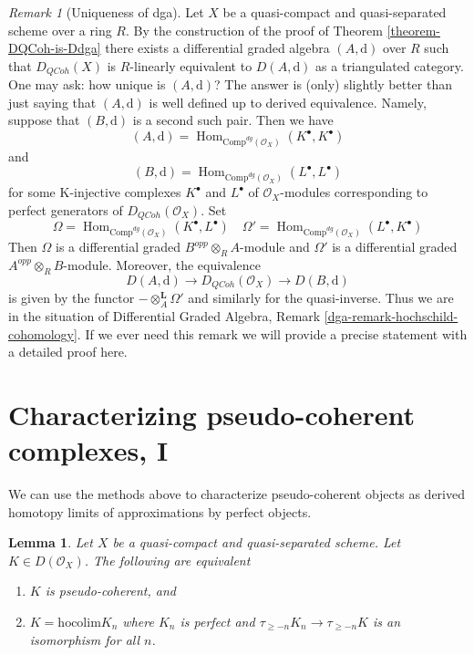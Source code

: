 \documentclass{stacks-project}
\theoremstyle{plain}
\newtheorem{lemma}[subsection]{Lemma}
\theoremstyle{definition}
\theoremstyle{remark}
\newtheorem{remark}[subsection]{Remark}
\numberwithin{equation}{subsection}
\def\Hom{\mathop{\mathrm{Hom}}\nolimits}
\def\QCoh{\mathit{QCoh}}
\begin{document}
\begin{remark}[Uniqueness of dga]
\label{remark-independence-choice}
Let $X$ be a quasi-compact and quasi-separated scheme over a ring $R$.
By the construction of the proof of
Theorem \ref{theorem-DQCoh-is-Ddga}
there exists a differential graded algebra $(A, \text{d})$ over $R$
such that $D_\QCoh(X)$ is $R$-linearly equivalent to
$D(A, \text{d})$ as a triangulated category.
One may ask: how unique is $(A, \text{d})$?
The answer is (only) slightly better than just saying that
$(A, \text{d})$ is well defined up to derived equivalence.
Namely, suppose that $(B, \text{d})$ is a second such pair.
Then we have
$$
(A, \text{d}) = \Hom_{\text{Comp}^{dg}(\mathcal{O}_X)}(K^\bullet, K^\bullet)
$$
and
$$
(B, \text{d}) = \Hom_{\text{Comp}^{dg}(\mathcal{O}_X)}(L^\bullet, L^\bullet)
$$
for some K-injective complexes $K^\bullet$ and $L^\bullet$
of $\mathcal{O}_X$-modules corresponding to perfect generators
of $D_\QCoh(\mathcal{O}_X)$. Set
$$
\Omega = \Hom_{\text{Comp}^{dg}(\mathcal{O}_X)}(K^\bullet, L^\bullet)
\quad
\Omega' = \Hom_{\text{Comp}^{dg}(\mathcal{O}_X)}(L^\bullet, K^\bullet)
$$
Then $\Omega$ is a differential graded $B^{opp} \otimes_R A$-module
and $\Omega'$ is a differential graded $A^{opp} \otimes_R B$-module.
Moreover, the equivalence
$$
D(A, \text{d}) \to D_\QCoh(\mathcal{O}_X) \to
D(B, \text{d})
$$
is given by the functor $- \otimes_A^\mathbf{L} \Omega'$ and
similarly for the quasi-inverse. Thus we are in the situation
of Differential Graded Algebra, Remark \ref{dga-remark-hochschild-cohomology}.
If we ever need this remark we will provide a precise statement
with a detailed proof here.
\end{remark}






\section{Characterizing pseudo-coherent complexes, I}
\label{section-pseudo-coherent-hocolim}

\noindent
We can use the methods above to characterize pseudo-coherent
objects as derived homotopy limits of approximations by perfect objects.

\begin{lemma}
\label{lemma-pseudo-coherent-hocolim}
Let $X$ be a quasi-compact and quasi-separated scheme.
Let $K \in D(\mathcal{O}_X)$. The following are equivalent
\begin{enumerate}
\item $K$ is pseudo-coherent, and
\item $K = \text{hocolim} K_n$ where
$K_n$ is perfect and $\tau_{\geq -n}K_n \to \tau_{\geq -n}K$
is an isomorphism for all $n$.
\end{enumerate}
\end{lemma}
\end{document}
